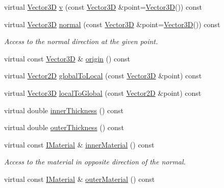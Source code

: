 \begin{DoxyCompactItemize}
\item 
virtual \hyperlink{class_d_d_surfaces_1_1_vector3_d}{Vector3D} \hyperlink{class_d_d4hep_1_1_d_d_rec_1_1_surface_ab2ff33cf97a5d3b516673b31867dd035}{v} (const \hyperlink{class_d_d_surfaces_1_1_vector3_d}{Vector3D} \&point=\hyperlink{class_d_d_surfaces_1_1_vector3_d}{Vector3D}()) const
\item 
virtual \hyperlink{class_d_d_surfaces_1_1_vector3_d}{Vector3D} \hyperlink{class_d_d4hep_1_1_d_d_rec_1_1_surface_a39933172300e705018ff3b3a0de450a3}{normal} (const \hyperlink{class_d_d_surfaces_1_1_vector3_d}{Vector3D} \&point=\hyperlink{class_d_d_surfaces_1_1_vector3_d}{Vector3D}()) const
\begin{DoxyCompactList}\small\item\em Access to the normal direction at the given point. \end{DoxyCompactList}\item 
virtual const \hyperlink{class_d_d_surfaces_1_1_vector3_d}{Vector3D} \& \hyperlink{class_d_d4hep_1_1_d_d_rec_1_1_surface_a4910106fc066884c4a53d9fbab52707e}{origin} () const
\item 
virtual \hyperlink{class_d_d_surfaces_1_1_vector2_d}{Vector2D} \hyperlink{class_d_d4hep_1_1_d_d_rec_1_1_surface_ad7ea93419ec45ad4491c84065bd930aa}{global\+To\+Local} (const \hyperlink{class_d_d_surfaces_1_1_vector3_d}{Vector3D} \&point) const
\item 
virtual \hyperlink{class_d_d_surfaces_1_1_vector3_d}{Vector3D} \hyperlink{class_d_d4hep_1_1_d_d_rec_1_1_surface_a766587a97ca4b6c7ef4d2f72b967379c}{local\+To\+Global} (const \hyperlink{class_d_d_surfaces_1_1_vector2_d}{Vector2D} \&point) const
\item 
virtual double \hyperlink{class_d_d4hep_1_1_d_d_rec_1_1_surface_a784001d72c1c77429fab90220c2af7e8}{inner\+Thickness} () const
\item 
virtual double \hyperlink{class_d_d4hep_1_1_d_d_rec_1_1_surface_a55a7d1f21ef278115e16cbb353ab01f7}{outer\+Thickness} () const
\item 
virtual const \hyperlink{class_d_d_surfaces_1_1_i_material}{I\+Material} \& \hyperlink{class_d_d4hep_1_1_d_d_rec_1_1_surface_a8e0b69cde006a054df7c33d8a781093b}{inner\+Material} () const
\begin{DoxyCompactList}\small\item\em Access to the material in opposite direction of the normal. \end{DoxyCompactList}\item 
virtual const \hyperlink{class_d_d_surfaces_1_1_i_material}{I\+Material} \& \hyperlink{class_d_d4hep_1_1_d_d_rec_1_1_surface_a510bdf9b19e1b4f8dad0b8770e513826}{outer\+Material} () const

\end{DoxyCompactItemize}
